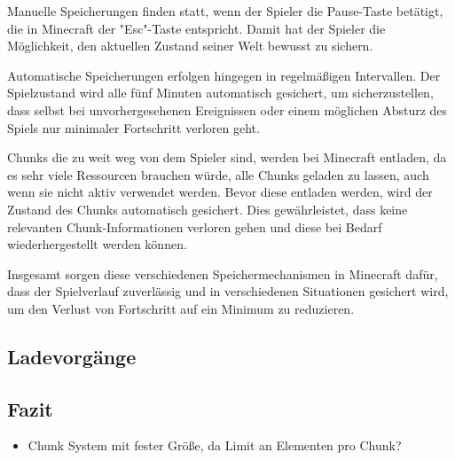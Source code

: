Manuelle Speicherungen finden statt, wenn der Spieler die Pause-Taste betätigt, die in Minecraft der "Esc"-Taste entspricht. Damit hat der Spieler die Möglichkeit, den aktuellen Zustand seiner Welt bewusst zu sichern.\cite{minecraftSpielstandSpeicherung} 

Automatische Speicherungen erfolgen hingegen in regelmäßigen Intervallen. Der Spielzustand wird alle fünf Minuten automatisch gesichert, um sicherzustellen, dass selbst bei unvorhergesehenen Ereignissen oder einem möglichen Absturz des Spiels nur minimaler Fortschritt verloren geht.\cite{minecraftSpielstandSpeicherung}

Chunks die zu weit weg von dem Spieler sind, werden bei Minecraft entladen, da es sehr viele Ressourcen brauchen würde, alle Chunks geladen zu lassen, auch wenn sie nicht aktiv verwendet werden. Bevor diese entladen werden, wird der Zustand des Chunks automatisch gesichert. Dies gewährleistet, dass keine relevanten Chunk-Informationen verloren gehen und diese bei Bedarf wiederhergestellt werden können.\cite{minecraftSpielstandSpeicherung}

Insgesamt sorgen diese verschiedenen Speichermechanismen in Minecraft dafür, dass der Spielverlauf zuverlässig und in verschiedenen Situationen gesichert wird, um den Verlust von Fortschritt auf ein Minimum zu reduzieren.




\subsection{Ladevorgänge}



\subsection{Fazit}
\begin{itemize}
    \item Chunk System mit fester Größe, da Limit an Elementen pro Chunk?
\end{itemize}




